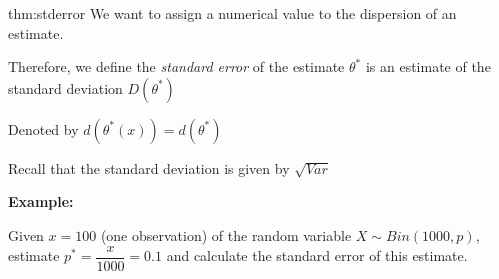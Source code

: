 \newpage
\begin{theo}{thm:stderror}
  We want to assign a numerical value to the dispersion of an estimate.\par
  \noindent Therefore, we define the \textit{standard error} of the estimate $\theta^*$ is an estimate of the standard deviation $D(\theta^*)$
  \par\bigskip
  \noindent Denoted by $d(\theta^*(x)) = d(\theta^*)$
  \par\bigskip
  \noindent Recall that the standard deviation is given by $\sqrt{Var}$
\end{theo}
\par\bigskip
\noindent\textbf{Example:}\par
\noindent Given $x=100$ (one observation) of the random variable $X\sim Bin(1000,p)$, estimate $p^* = \dfrac{x}{1000} = 0.1$ and calculate the standard error of this estimate.
\par\bigskip
